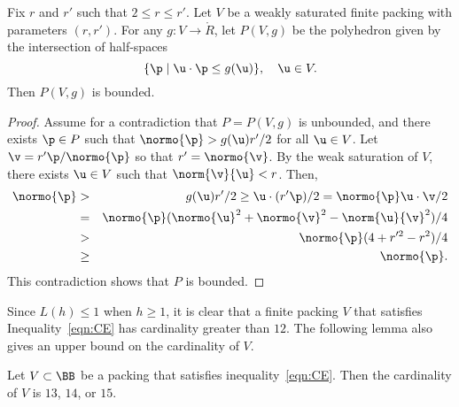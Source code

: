 \begin{lemma}[]\label{lemma:poly-bounded} 
Fix $r$ and $r'$ such that $2\le r\le r'$.
Let $ V$ be a weakly saturated finite packing with parameters $(r,r')$.
For any $g: V\to\ring{R}$, let $P( V,g)$ be the
polyhedron given by the intersection of half-spaces
\begin{displaymath} 
\{\p \mid  \u\cdot \p \le g( \u)\},\quad \u\in V.
\end{displaymath}
Then $P( V,g)$ is bounded.
\end{lemma}
%

\begin{proof} Assume for a contradiction that $P=P( V,g)$ is
  unbounded, and there exists $\p\in P$ such that $\normo{\p} > g( \u)
  r'/2$ for all $ \u\in V$.  Let $\v = r' \p/\normo{\p}$ so that
  $r'=\normo{\v}$.  By the weak saturation of $ V$, there exists $
  \u\in V$ such that $\norm{\v}{ \u}<r$.  Then,
\begin{eqnarray*} 
\normo{\p} &>& g( \u) r'/2 \ge  \u\cdot (r' \p)/2 = \normo{\p}  \u\cdot \v /2\\
&=& \normo{\p} (\normo{ \u}^2 + \normo{\v}^2 - \norm{ \u}{\v}^2)/4\\
&>& \normo{\p}(4+r'^2-r^2)/4\\
&\ge& \normo{\p}.
\end{eqnarray*}
This contradiction shows that $P$ is bounded.
\end{proof}




Since $L(h)\le 1$ when $h\ge1$, it is clear that a finite packing $V$
that satisfies Inequality~\ref{eqn:CE} has cardinality greater than $12$.
The following lemma also gives an upper bound on the cardinality of $V$.

\begin{lemma}[]\label{lemma:13-14}  %
Let $V\subset \BB$ be a packing that satisfies
inequality~\ref{eqn:CE}.  Then the cardinality of $V$ is $13$, $14$, or $15$.
\end{lemma}


